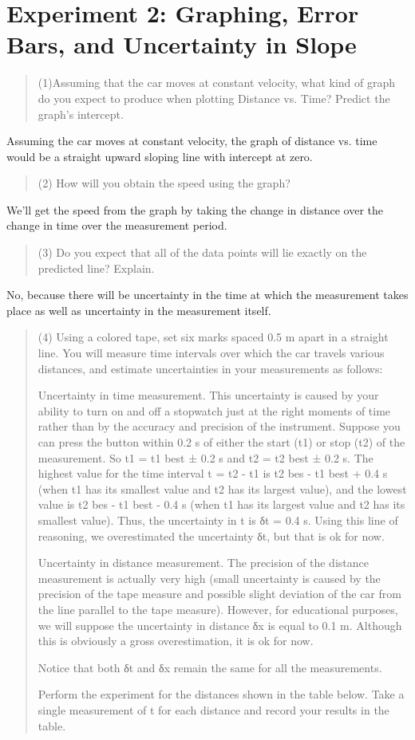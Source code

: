 \documentclass[8pt]{extarticle}
\begin{document}
\section*{Experiment 2: Graphing, Error Bars, and Uncertainty in Slope}
\begin{quote}
	(1)Assuming that the car moves at constant velocity, what kind of graph do you expect to produce when plotting Distance vs. Time?  Predict the graph’s intercept.
\end{quote}
Assuming the car moves at constant velocity, the graph of distance vs. time would be a straight upward sloping line with intercept at zero.
\begin{quote}
	(2) How will you obtain the speed using the graph?
\end{quote}
We'll get the speed from the graph by taking the change in distance over the change in time over the measurement period.
\begin{quote}
	(3) Do you expect that all of the data points will lie exactly on the predicted line?  Explain.
\end{quote}
No, because there will be uncertainty in the time at which the measurement takes place as well as uncertainty in the measurement itself.
\begin{quote}
	(4) Using a colored tape, set six marks spaced 0.5 m apart in a straight line. You will measure time intervals over which the car travels various distances, and estimate uncertainties in your measurements as follows:
	
	Uncertainty in time measurement. This uncertainty is caused by your ability to turn on and off a stopwatch just at the right moments of time rather than by the accuracy and precision of the instrument. Suppose you can press the button within 0.2 s of either the start (t1) or stop (t2) of the measurement. So t1 = t1 best ± 0.2 s and t2 = t2 best ± 0.2 s. The highest value for the time interval t = t2 - t1 is t2 bes - t1 best + 0.4 s (when t1 has its smallest value and t2 has its largest value), and the lowest value is t2 bes - t1 best - 0.4 s (when t1 has its largest value and t2 has its smallest value). Thus, the uncertainty in t is δt = 0.4 s. Using this line of reasoning, we overestimated the uncertainty δt, but that is ok for now. 
	
	Uncertainty in distance measurement. The precision of the distance measurement is actually very high (small uncertainty is caused by the precision of the tape measure and possible slight deviation of the car from the line parallel to the tape measure). However, for educational purposes, we will suppose the uncertainty in distance δx is equal to 0.1 m. Although this is obviously a gross overestimation, it is ok for now.
	
	Notice that both δt and δx remain the same for all the measurements.
	
	Perform the experiment for the distances shown in the table below. Take a single measurement of t for each distance and record your results in the table.
\end{quote}
\end{document}
